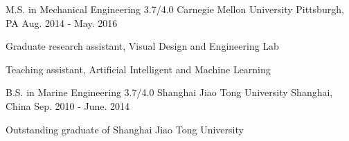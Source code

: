 

\begin{cventries}

  \cventry
    {M.S. in Mechanical Engineering 3.7/4.0} %
    {Carnegie Mellon University } %
    {Pittsburgh, PA} %
    {Aug. 2014 - May. 2016} %
    {
      \begin{cvitems} %
        \item {Graduate research assistant, Visual Design and Engineering Lab}
        \item {Teaching assistant, Artificial Intelligent and Machine Learning}
      \end{cvitems}
    }

  \cventry
    {B.S. in Marine Engineering 3.7/4.0} %
    {Shanghai Jiao Tong University} %
    {Shanghai, China} %
    {Sep. 2010 - June. 2014} %
    {
      \begin{cvitems} %
        \item {Outstanding graduate of Shanghai Jiao Tong University}
      \end{cvitems}
    }

\end{cventries}
